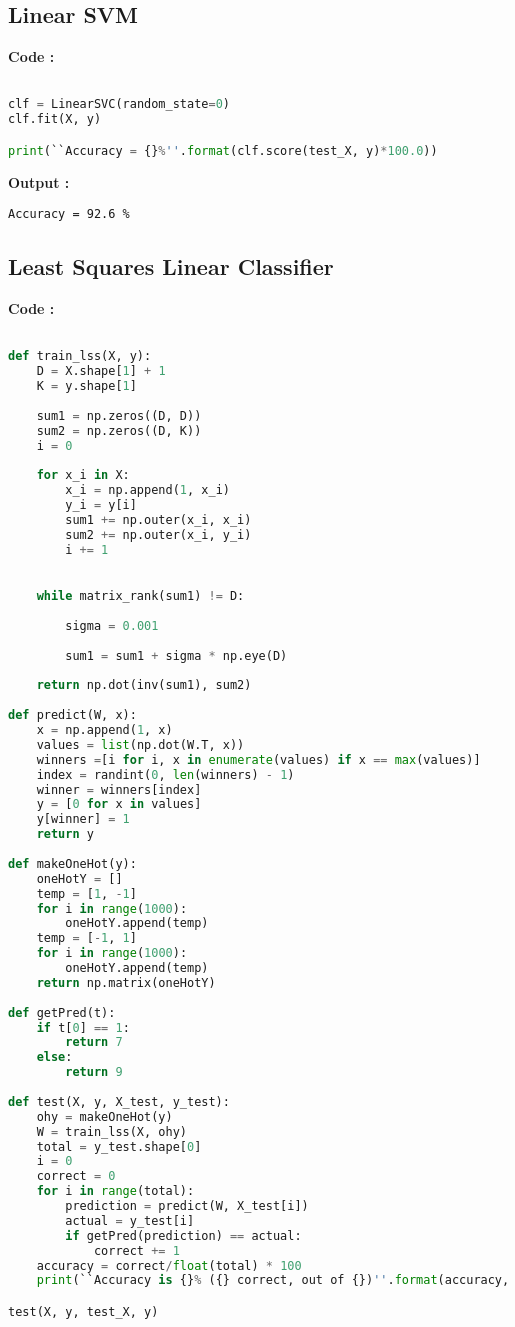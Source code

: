 \documentclass[a4paper, 11pt]{article}
\begin{document}
\subsection*{Linear SVM}

\textbf{Code :}

\begin{lstlisting}[language=Python]

clf = LinearSVC(random_state=0)
clf.fit(X, y)

print(``Accuracy = {}%''.format(clf.score(test_X, y)*100.0))

\end{lstlisting}

\textbf{Output :}
\begin{verbatim}
Accuracy = 92.6 %
\end{verbatim}

\subsection*{Least Squares Linear Classifier}

\textbf{Code :}

\begin{lstlisting}[language=Python]

def train_lss(X, y):
    D = X.shape[1] + 1
    K = y.shape[1]
    
    sum1 = np.zeros((D, D))
    sum2 = np.zeros((D, K))
    i = 0
    
    for x_i in X:
        x_i = np.append(1, x_i)
        y_i = y[i]
        sum1 += np.outer(x_i, x_i)
        sum2 += np.outer(x_i, y_i)
        i += 1

    
    while matrix_rank(sum1) != D:
        
        sigma = 0.001
        
        sum1 = sum1 + sigma * np.eye(D)
    
    return np.dot(inv(sum1), sum2)
    
def predict(W, x):
    x = np.append(1, x)
    values = list(np.dot(W.T, x))
    winners =[i for i, x in enumerate(values) if x == max(values)]
    index = randint(0, len(winners) - 1)
    winner = winners[index]
    y = [0 for x in values]
    y[winner] = 1
    return y
    
def makeOneHot(y):
    oneHotY = []
    temp = [1, -1]
    for i in range(1000):
        oneHotY.append(temp)
    temp = [-1, 1]
    for i in range(1000):
        oneHotY.append(temp)
    return np.matrix(oneHotY)
    
def getPred(t):
    if t[0] == 1:
        return 7
    else:
        return 9
        
def test(X, y, X_test, y_test):
    ohy = makeOneHot(y)
    W = train_lss(X, ohy)
    total = y_test.shape[0]
    i = 0
    correct = 0
    for i in range(total):
        prediction = predict(W, X_test[i])
        actual = y_test[i]
        if getPred(prediction) == actual:
            correct += 1
    accuracy = correct/float(total) * 100
    print(``Accuracy is {}% ({} correct, out of {})''.format(accuracy, correct, total))

test(X, y, test_X, y)

\end{lstlisting}
\end{document}
